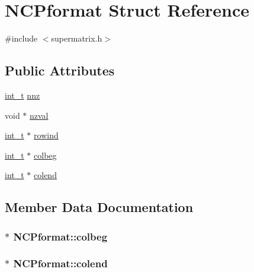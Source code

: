 \hypertarget{structNCPformat}{}\section{N\+C\+Pformat Struct Reference}
\label{structNCPformat}


{\ttfamily \#include $<$supermatrix.\+h$>$}

\subsection*{Public Attributes}
\begin{DoxyCompactItemize}
\item 
\hyperlink{slu__cdefs_8h_ab6fd6105e64ed14a0c9281326f05e623}{int\+\_\+t} \hyperlink{structNCPformat_ac8c12ffc9edd0906608612727ad406ed}{nnz}
\item 
void $\ast$ \hyperlink{structNCPformat_a519ed66fdf9da30c76c079474503c764}{nzval}
\item 
\hyperlink{slu__cdefs_8h_ab6fd6105e64ed14a0c9281326f05e623}{int\+\_\+t} $\ast$ \hyperlink{structNCPformat_a8a27cd5a756bc313cc3c487a84e8ba30}{rowind}
\item 
\hyperlink{slu__cdefs_8h_ab6fd6105e64ed14a0c9281326f05e623}{int\+\_\+t} $\ast$ \hyperlink{structNCPformat_a2192334a0f76d4c18784caa1f8783f01}{colbeg}
\item 
\hyperlink{slu__cdefs_8h_ab6fd6105e64ed14a0c9281326f05e623}{int\+\_\+t} $\ast$ \hyperlink{structNCPformat_a86dcc41e83595a12ecd88d57748430c0}{colend}
\end{DoxyCompactItemize}


\subsection{Member Data Documentation}
\hypertarget{structNCPformat_a2192334a0f76d4c18784caa1f8783f01}{}
\subsubsection[{colbeg}]{$\ast$ N\+C\+Pformat\+::colbeg}\label{structNCPformat_a2192334a0f76d4c18784caa1f8783f01}
\hypertarget{structNCPformat_a86dcc41e83595a12ecd88d57748430c0}{}
\subsubsection[{colend}]{$\ast$ N\+C\+Pformat\+::colend}\label{structNCPformat_a86dcc41e83595a12ecd88d57748430c0}
\hypertarget{structNCPformat_ac8c12ffc9edd0906608612727ad406ed}{}
